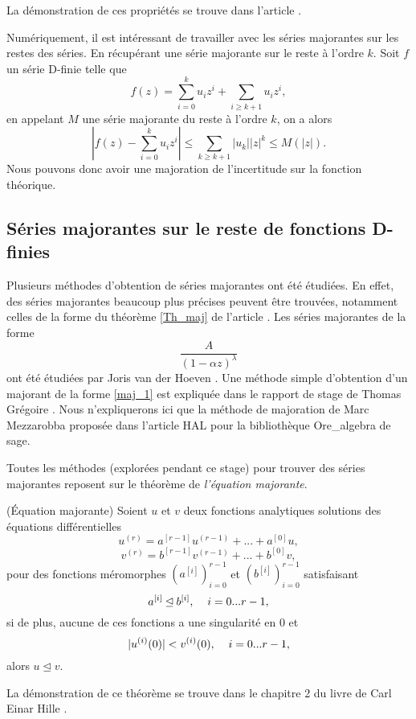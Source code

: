 \documentclass[a4paper,10pt]{article}
\begin{document}
	\noindent La démonstration de ces propriétés se trouve dans l'article \cite{hille1997ordinary}.
	
	\vspace{4mm}
	
	
	Numériquement, il est intéressant de travailler avec les séries majorantes sur les restes des séries. En récupérant une série majorante sur le reste à l'ordre $k$. Soit $f$ un série D-finie telle que 
	\[f(z)=\sum_{i=0}^{k}u_iz^i+\sum_{i \geq k+1}u_iz^i,\]
	en appelant $M$ une série majorante du reste à l'ordre $k$, on a alors
	\[|f(z)-\sum_{i=0}^{k}u_iz^i| \leq \sum_{k\geq k+1}|u_k||z|^k \leq M(|z|).\]
	Nous pouvons donc avoir une majoration de l'incertitude sur la fonction théorique.
	
	\subsection{Séries majorantes sur le reste de fonctions D-finies}
	
	Plusieurs méthodes d'obtention de séries majorantes ont été étudiées. En effet, des séries majorantes beaucoup plus précises peuvent être trouvées, notamment celles de la forme du théorème \ref{Th_maj} de l'article \cite{MezzarobbaSalvy2010}. Les séries majorantes de la forme
	\begin{equation}
		\frac{A}{(1-\alpha z)^\lambda}
		\label{maj_1}
	\end{equation}
	ont été étudiées par Joris van der Hoeven  \cite{van2001fast}. Une méthode simple d'obtention d'un majorant de la forme \eqref{maj_1} est expliquée dans le rapport de stage de Thomas Grégoire \cite{gregoire2012certified}. Nous n'expliquerons ici que la méthode de majoration de Marc Mezzarobba proposée dans l'article HAL \cite{Mezzarobba2019} pour la bibliothèque Ore\_algebra de sage.
	
	\vspace{4mm}
	
	Toutes les méthodes (explorées pendant ce stage) pour trouver des séries majorantes reposent sur le théorème de \textit{l'équation majorante}.
	
	\begin{theorem}(Équation majorante)
		Soient $u$ et $v$ deux fonctions analytiques solutions des équations différentielles
		\[u^{(r)}=a^{[r-1]}u^{(r-1)}+...+a^{[0]}u,\]
		\[v^{(r)}=b^{[r-1]}v^{(r-1)}+...+b^{[0]}v,\]
		pour des fonctions méromorphes $(a^{[i]})_{i=0}^{r-1}$ et $(b^{[i]})_{i=0}^{r-1}$ satisfaisant 
		\[a^{[i]} \unlhd b^{[i]}, \hspace{4mm} i=0...r-1,\]
		si de plus, aucune de ces fonctions a une singularité en 0 et
		\[|u^{(i)}(0)|<v^{(i)}(0),\hspace{4mm} i=0...r-1,\] 
		alors $u\unlhd v$.
	\end{theorem}
	\noindent La démonstration de ce théorème se trouve dans le chapitre 2 du livre de Carl Einar Hille \cite{hille1997ordinary}.
	
\end{document}
